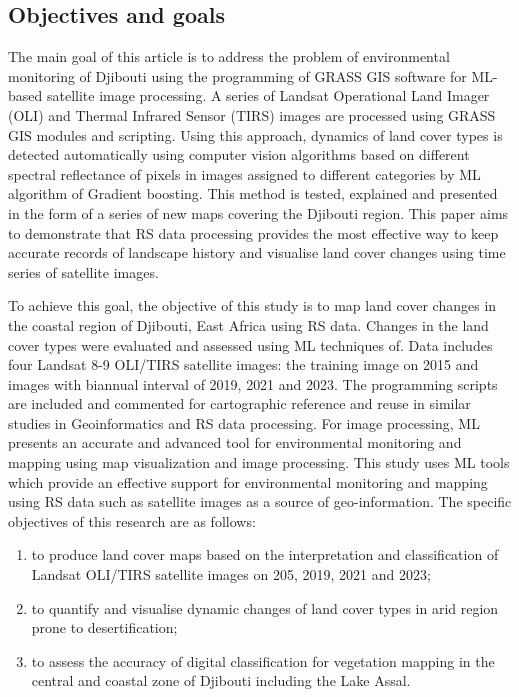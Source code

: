 \documentclass[jimaging,article,submit,pdftex,moreauthors]{Definitions/mdpi}
\begin{document}
\subsection{Objectives and goals}
The main goal of this article is to address the problem of environmental monitoring of Djibouti using the programming of GRASS GIS software for ML-based satellite image processing. A series of Landsat Operational Land Imager (OLI) and Thermal Infrared Sensor (TIRS) images are processed using GRASS GIS modules and scripting. Using this approach, dynamics of land cover types is detected automatically using computer vision algorithms based on different spectral reflectance of pixels in images assigned to different categories by ML algorithm of Gradient boosting. This method is tested, explained and presented in the form of a series of new maps covering the Djibouti region. This paper aims to demonstrate that RS data processing provides the most effective way to keep accurate records of landscape history and visualise land cover changes using time series of satellite images. 

To achieve this goal, the objective of this study is to map land cover changes in the coastal region of Djibouti, East Africa using RS data. Changes in the land cover types were evaluated and assessed using ML techniques of. Data includes four Landsat 8-9 OLI/TIRS satellite images: the training image on 2015 and images with biannual interval of 2019, 2021 and 2023. The programming scripts are included and commented for cartographic reference and reuse in similar studies in Geoinformatics and RS data processing. For image processing, ML presents an accurate and advanced tool for environmental monitoring and mapping using map visualization and image processing. This study uses ML tools which provide an effective support for environmental monitoring and mapping using RS data such as satellite images as a source of geo-information. The specific objectives of this research are as follows:

\begin{enumerate}
	\item to produce land cover maps based on the interpretation and classification of Landsat OLI/TIRS satellite images on 205, 2019, 2021 and 2023; 
	\item to quantify and visualise dynamic changes of land cover types in arid region prone to desertification; 
	\item to assess the accuracy of digital classification for vegetation mapping in the central and coastal zone of Djibouti including the Lake Assal. 
\end{enumerate}
\end{document}
